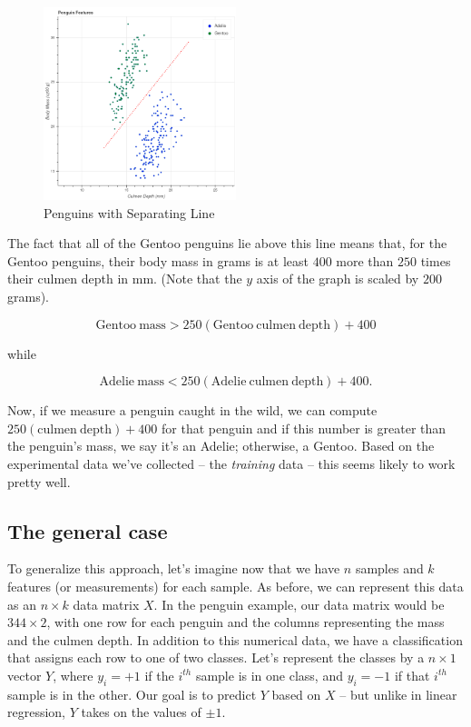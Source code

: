 \documentclass[
]{article}
\begin{document}
\begin{figure}
\hypertarget{fig:penguinsline}{%
\centering
\includegraphics[width=0.5\textwidth,height=\textheight]{../img/penguins_with_line.png}
\caption{Penguins with Separating Line}\label{fig:penguinsline}
}
\end{figure}

The fact that all of the Gentoo penguins lie above this line means that,
for the Gentoo penguins, their body mass in grams is at least \(400\)
more than \(250\) times their culmen depth in mm. (Note that the \(y\)
axis of the graph is scaled by \(200\) grams).

\[
\mathrm{Gentoo\ mass}> 250(\mathrm{Gentoo\ culmen\ depth})+400
\]

while

\[
\mathrm{Adelie\ mass}<250(\mathrm{Adelie\ culmen\ depth})+400.
\]

Now, if we measure a penguin caught in the wild, we can compute
\(250(\mathrm{culmen\ depth})+400\) for that penguin and if this number
is greater than the penguin's mass, we say it's an Adelie; otherwise, a
Gentoo. Based on the experimental data we've collected -- the
\emph{training} data -- this seems likely to work pretty well.

\hypertarget{the-general-case}{%
\subsection{The general case}\label{the-general-case}}

To generalize this approach, let's imagine now that we have \(n\)
samples and \(k\) features (or measurements) for each sample. As before,
we can represent this data as an \(n\times k\) data matrix \(X\). In the
penguin example, our data matrix would be \(344\times 2\), with one row
for each penguin and the columns representing the mass and the culmen
depth. In addition to this numerical data, we have a classification that
assigns each row to one of two classes. Let's represent the classes by a
\(n\times 1\) vector \(Y\), where \(y_{i}=+1\) if the \(i^{th}\) sample
is in one class, and \(y_{i}=-1\) if that \(i^{th}\) sample is in the
other. Our goal is to predict \(Y\) based on \(X\) -- but unlike in
linear regression, \(Y\) takes on the values of \(\pm 1\).
\end{document}
